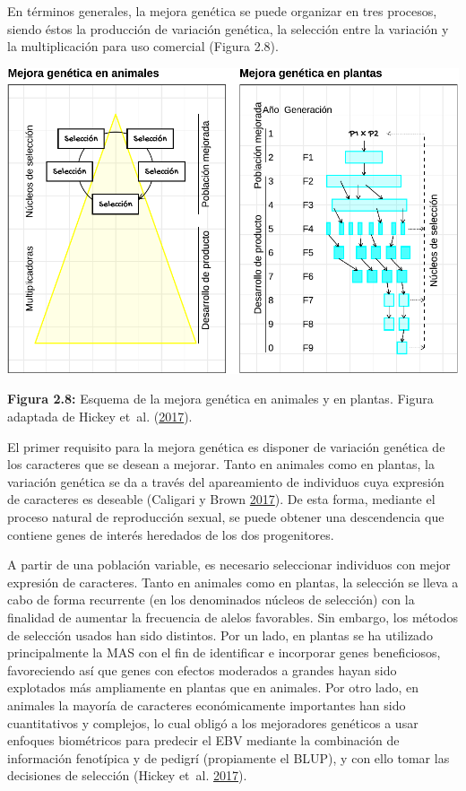 \documentclass[11pt,spanish,a4paper,oneside,]{book} %
\begin{document}
En términos generales, la mejora genética se puede organizar en tres procesos, siendo éstos la producción de variación genética, la selección entre la variación y la multiplicación para uso comercial (Figura 2.8).

\begin{center}\includegraphics[width=1\linewidth]{figures/Mej_Anim_Plan} \end{center}

\noindent 
\textbf{Figura 2.8:} Esquema de la mejora genética en animales y en plantas. Figura adaptada de Hickey et~al. (\protect\hyperlink{ref-cite:44}{2017}).

\hspace*{1em}

El primer requisito para la mejora genética es disponer de variación genética de los caracteres que se desean a mejorar. Tanto en animales como en plantas, la variación genética se da a través del apareamiento de individuos cuya expresión de caracteres es deseable (Caligari y Brown \protect\hyperlink{ref-cite:42}{2017}). De esta forma, mediante el proceso natural de reproducción sexual, se puede obtener una descendencia que contiene genes de interés heredados de los dos progenitores.

A partir de una población variable, es necesario seleccionar individuos con mejor expresión de caracteres. Tanto en animales como en plantas, la selección se lleva a cabo de forma recurrente (en los denominados núcleos de selección) con la finalidad de aumentar la frecuencia de alelos favorables. Sin embargo, los métodos de selección usados han sido distintos. Por un lado, en plantas se ha utilizado principalmente la MAS con el fin de identificar e incorporar genes beneficiosos, favoreciendo así que genes con efectos moderados a grandes hayan sido explotados más ampliamente en plantas que en animales. Por otro lado, en animales la mayoría de caracteres económicamente importantes han sido cuantitativos y complejos, lo cual obligó a los mejoradores genéticos a usar enfoques biométricos para predecir el EBV mediante la combinación de información fenotípica y de pedigrí (propiamente el BLUP), y con ello tomar las decisiones de selección (Hickey et~al. \protect\hyperlink{ref-cite:44}{2017}).
\end{document}
